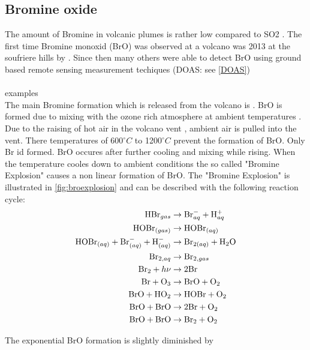 \documentclass  [
  paper    = a4,
  BCOR     = 10mm,
  twoside,
  fontsize = 12pt,
  fleqn,
  toc      = bibnumbered,
  toc      = listofnumbered,
  numbers  = noendperiod,
  headings = normal,
  listof   = leveldown,
  version  = 3.03
]                                       {scrreprt}
\begin{document}
\subsection{Bromine oxide}
The amount of Bromine in volcanic plumes is rather low compared to SO2 \cite{Bobrowski 2013}. The first time Bromine monoxid (BrO) was observed at a volcano was 2013 at the soufriere hills by \cite{Bobrowski 2013}. Since then many others were able to detect BrO using ground based remote sensing measurement techiques (DOAS: see \cref{DOAS})\\
\\
examples
\\
The main Bromine formation which is released from the volcano is  . BrO is formed due to mixing with the ozone rich atmosphere at ambient temperatures \cite{bobrowski2007reactive}.\\
Due to the raising of hot air in the volcano vent , ambient air is pulled into the vent. There temperatures of  600$^{\circ}C$ to 1200$^{\circ}C$    prevent the formation of BrO. Only Br id formed. BrO occures after further cooling and mixing while rising. When the temperature cooles down to ambient conditions the so called "Bromine Explosion" causes a non linear formation of BrO.
The "Bromine Explosion" is illustrated in \cref{fig:broexplosion} and can be described with the following reaction cycle:
\begin{align}
\ce{HBr}_{gas} &\rightarrow \ce{Br}^{-}_{aq} + \ce{H}^{+}_{aq}\\
\ce{HOBr}_{(gas)} &\rightarrow \ce{HOBr}_{(aq)} \\
\ce{HOBr}_{(aq)} + \ce{Br}^{-}_{(aq)} + \ce{H}^{-}_{(aq)} &\rightarrow
\ce{Br}_{2(aq)} +  \ce{H2O}\\
\ce{Br}_{2,aq} &\rightarrow \ce{Br}_{2,gas} \\
\ce{Br2} + h\nu &\rightarrow 2 \ce{Br} \\
\ce{Br} + \ce{O3} &\rightarrow \ce{BrO} + \ce{O2} \\
\ce{BrO} + \ce{HO2} &\rightarrow \ce{HOBr} + \ce{O2} \\
\ce{BrO} + \ce{BrO} &\rightarrow 2 \ce{Br} + \ce{O2} \\
\ce{BrO} + \ce{BrO} &\rightarrow \ce{Br2} + \ce{O2}
\end{align}

The exponential BrO formation is slightly diminished by
\end{document}
